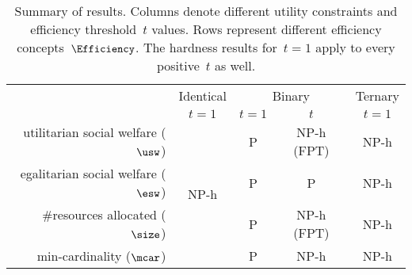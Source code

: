 	\begin{table*}[t]
		\caption{Summary of results. Columns denote different utility constraints and
			efficiency threshold~$t$ values.
			Rows represent different efficiency concepts~$\Efficiency$. The hardness
			results for~$t=1$ apply to every positive~$t$ as well.} \label{tab:results}
		\centering
		\renewcommand{\arraystretch}{1.25}
		\setlength{\tabcolsep}{12pt}
		\begin{tabular}{rcccc}
			\toprule
			& Identical & \multicolumn{2}{c}{Binary} &	Ternary \\ 
			\cmidrule(lr){3-4}
			& $t=1$  & $t=1$ & $t$ & $t=1$ \\\midrule
			utilitarian social welfare ($\usw$) & \multirow{4}{*}{NP-h} & P & NP-h (FPT) & NP-h \\ 
			egalitarian social welfare ($\esw$) & ~ & P & P & NP-h \\ 
			\#resources allocated ($\size$) & ~ & P & NP-h (FPT) & NP-h  \\ 
			min-cardinality ($\mcar$) & ~ & P & NP-h & NP-h \\ \bottomrule
		\end{tabular}      
	\end{table*}